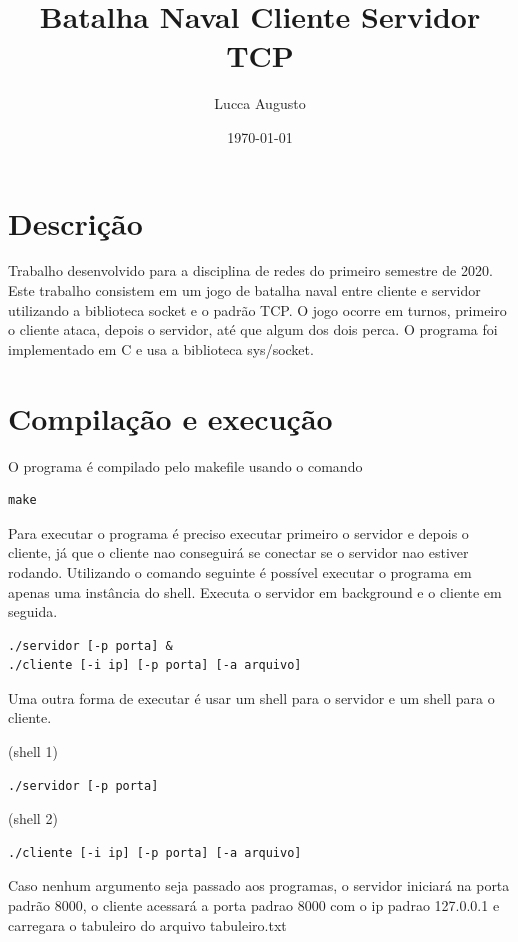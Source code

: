 \documentclass[11pt]{article}
\title{Batalha Naval Cliente Servidor TCP}
\author {Lucca Augusto}
\date{\today}
\begin{document}
\maketitle

\section{Descrição}
Trabalho desenvolvido para a disciplina de redes do primeiro semestre de 2020.
Este trabalho consistem em um jogo de batalha naval entre cliente e servidor utilizando a biblioteca socket e o padrão TCP.
O jogo ocorre em turnos, primeiro o cliente ataca, depois o servidor, até que algum dos dois perca.
O programa foi implementado em C e usa a biblioteca sys/socket. 

\section{Compilação e execução}
O programa é compilado pelo makefile usando o comando

\begin{lstlisting}
make
\end{lstlisting}

Para executar o programa é preciso executar primeiro o servidor e depois o cliente, já que o cliente nao conseguirá se conectar se o servidor nao estiver rodando.
Utilizando o comando seguinte é possível executar o programa em apenas uma instância do shell. Executa o servidor em background e o cliente em seguida.

\begin{lstlisting}
./servidor [-p porta] &
./cliente [-i ip] [-p porta] [-a arquivo]
\end{lstlisting}

Uma outra forma de executar é usar um shell para o servidor e um shell para o cliente.

(shell 1)
\begin{lstlisting}
./servidor [-p porta]
\end{lstlisting}


(shell 2)
\begin{lstlisting}
./cliente [-i ip] [-p porta] [-a arquivo]
\end{lstlisting}

Caso nenhum argumento seja passado aos programas, o servidor iniciará na porta padrão 8000, o cliente acessará a porta padrao 8000 com o ip padrao 127.0.0.1 e carregara o tabuleiro do arquivo tabuleiro.txt
\end{document}
